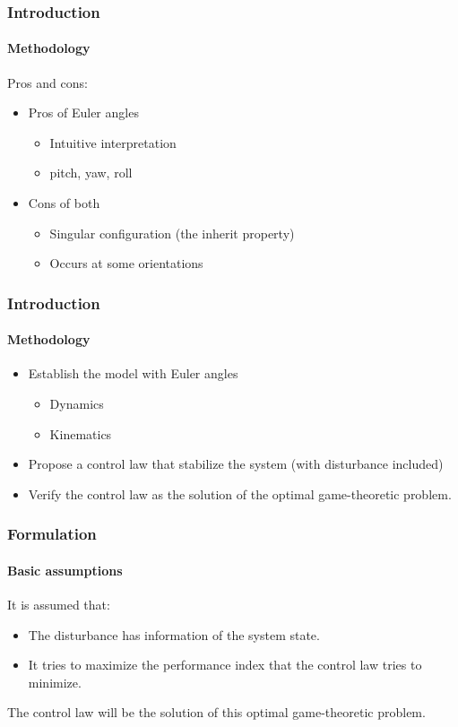 \documentclass{beamer}
\begin{document}
\begin{frame}
\frametitle{Introduction}
\framesubtitle{Methodology}
Pros and cons:
\begin{itemize}
	\item Pros of Euler angles
	\begin{itemize}
		\item Intuitive interpretation
		\item pitch, yaw, roll
	\end{itemize}
	\item Cons of both
	\begin{itemize}
		\item Singular configuration (the inherit property)
		\item Occurs at some orientations
	\end{itemize}
\end{itemize}
\end{frame}

\begin{frame}
\frametitle{Introduction}
\framesubtitle{Methodology}
\begin{itemize}
	\item Establish the model with Euler angles
	\begin{itemize}
		\item Dynamics
		\item Kinematics
	\end{itemize}
	\item Propose a control law that stabilize the system (with disturbance included)
	\item Verify the control law as the solution of the optimal game-theoretic problem. 
\end{itemize}
\end{frame}

\begin{frame}
\frametitle{Formulation}
\framesubtitle{Basic assumptions}
It is assumed that:
\begin{itemize}
	\item The disturbance has information of the system state. 
	\item It tries to maximize the performance index that the control law tries to minimize. 

\end{itemize}
The control law will be the solution of this optimal game-theoretic problem.
\end{frame}
\end{document}
